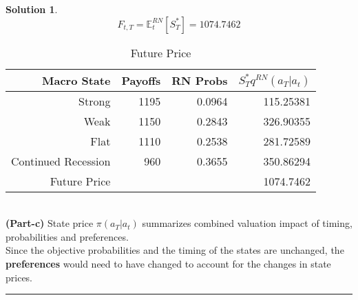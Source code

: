 \documentclass[a4paper, 10pt]{article}
\renewcommand{\arraystretch}{1.4}
\theoremstyle{definition}
\theoremstyle{hSol}
\newtheorem*{solution}{Solution}
\begin{document}
\begin{solution}
\begin{equation}
  F_{t,T} = \mathbb{E}_t^{RN}\left[S^*_T\right] = 1074.7462
\end{equation}
\begin{table}[H]
  \centering
  \caption{Future Price}
  \vspace{4pt}
  \def\arraystretch{1.15}
  \begin{tabular}{rrrr}
    \toprule
    Macro State & Payoffs & RN Probs & $S^*_Tq^{RN}(a_T|a_t)$ \\
    \hline
    Strong & 1195  & 0.0964 & 115.25381 \\
    Weak  & 1150  & 0.2843 & 326.90355 \\
    Flat  & 1110  & 0.2538 & 281.72589 \\
    Continued Recession & 960   & 0.3655 & 350.86294 \\
    \hline
    Future Price &       &       & 1074.7462 \\
    \bottomrule
  \end{tabular}%
  \label{tab:addlabel}%
\end{table}%
~\\
\textbf{(Part-c)}
State price $\pi(a_T|a_t)$ summarizes combined valuation impact of timing, probabilities and preferences. \\
Since the objective probabilities and the timing of the states are unchanged, the \textbf{preferences} would need to have changed to account for the changes in state prices.

\end{solution}

\noindent\rule{16cm}{0.4pt}
\end{document}
